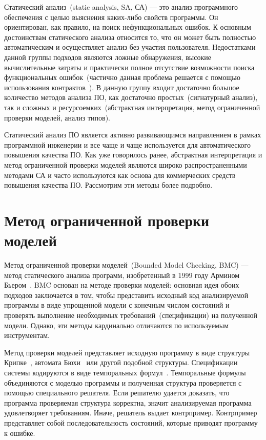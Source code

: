 Статический анализ~(static analysis, SA, СА) --- это анализ программного 
обеспечения с целью выяснения 
каких-либо свойств программы. Он ориентирован, как правило, на поиск
нефункциональных ошибок. К основным достоинствам статического анализа
относится то, что он может быть полностью автоматическим и осуществляет 
анализ без участия пользователя. Недостатками данной группы подходов
являются ложные обнаружения, высокие вычислительные затраты и практически полное
отсутствие возможности поиска функциональных ошибок~(частично данная проблема 
решается с помощью использования контрактов~\cite{designByContract}). В данную
группу входит достаточно большое количество методов анализа ПО, как достаточно
простых~(сигнатурный анализ), так и сложных и ресурсоемких~(абстрактная 
интерпретация, метод ограниченной проверки моделей, анализ типов).

Статический анализ ПО является активно развивающимся направлением в рамках
программной инженерии и все чаще и чаще используется для автоматического 
повышения качества ПО. Как уже говорилось ранее, абстрактная интерпретация и 
метод ограниченной проверки моделей являются широко распространенными 
методами СА и часто используются как основа для коммерческих средств
повышения качества ПО. Рассмотрим эти методы более подробно.

\section{Метод ограниченной проверки моделей}

Метод ограниченной проверки моделей~(Bounded Model Checking, BMC) --- метод
статического анализа программ, изобретенный в 1999 году Армином 
Бьером~\cite{symbolicModelChecking}.
BMC основан на методе проверки моделей: основная идея обоих подходов заключается
в том, чтобы представить исходный код анализируемой программы в виде упрощенной
модели с конечным числом состояний и проверять 
выполнение необходимых требований~(спецификации) на полученной модели. Однако, 
эти методы кардинально отличаются по используемым инструментам.

Метод проверки моделей представляет исходную программу в виде структуры 
Крипке~\cite{kripkeModel}, автомата Бюхи~\cite{buchiAutomata} или другой 
подобной структуры. Спецификации системы кодируются в виде темпоральных 
формул~\cite{temporalLogic}. Темпоральные формулы объединяются с моделью программы 
и полученная структура проверяется с помощью специального решателя. 
Если решателю удается доказать, что программа проверяемая структура корректна, 
значит анализируемая программа удовлетворяет требованиям. Иначе, решатель выдает
контрпример. Контрпример представляет собой последовательность состояний,
которые приводят программу к ошибке.

